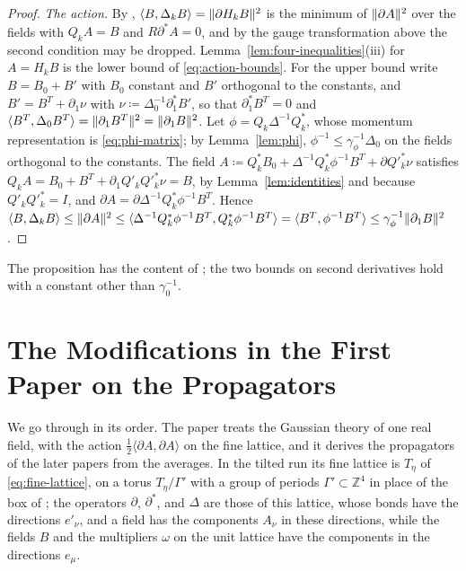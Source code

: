 \documentclass[11pt]{preprint}
\DeclarePairedDelimiter{\norm}{\lVert}{\rVert}
\numberwithin{equation}{section}
\theoremstyle{definition}
\theoremstyle{remark}
\theoremstyle{plain}
\begin{document}
\begin{proof}
\emph{The action.} By \cite[(1.47)--(1.65)]{BalabanPRT1}, $\langle B, \Delta_kB\rangle = \norm{\partial H_kB}^2$ is the minimum of $\norm{\partial A}^2$ over the fields with $Q_kA = B$ and $R\partial^*A = 0$, and by the gauge transformation above the second condition may be dropped. Lemma~\ref{lem:four-inequalities}(iii) for $A = H_kB$ is the lower bound of \eqref{eq:action-bounds}. For the upper bound write $B = B_0 + B'$ with $B_0$ constant and $B'$ orthogonal to the constants, and $B' = B^T + \partial_1\nu$ with $\nu \coloneqq \Delta_0^{-1}\partial_1^*B'$, so that $\partial_1^*B^T = 0$ and $\langle B^T, \Delta_0B^T\rangle = \norm{\partial_1B^T}^2 = \norm{\partial_1B}^2$. Let $\phi = Q_k\Delta^{-1}Q_k^*$, whose momentum representation is \eqref{eq:phi-matrix}; by Lemma~\ref{lem:phi}, $\phi^{-1} \leq \gamma_\phi^{-1}\Delta_0$ on the fields orthogonal to the constants. The field $A \coloneqq Q_k^*B_0 + \Delta^{-1}Q_k^*\phi^{-1}B^T + \partial Q'^*_k\nu$ satisfies $Q_kA = B_0 + B^T + \partial_1Q'_kQ'^*_k\nu = B$, by Lemma~\ref{lem:identities} and because $Q'_kQ'^*_k = I$, and $\partial A = \partial\Delta^{-1}Q_k^*\phi^{-1}B^T$. Hence $\langle B, \Delta_kB\rangle \leq \norm{\partial A}^2 \leq \langle\Delta^{-1}Q_k^*\phi^{-1}B^T, Q_k^*\phi^{-1}B^T\rangle = \langle B^T, \phi^{-1}B^T\rangle \leq \gamma_\phi^{-1}\norm{\partial_1B}^2$.
\end{proof}

The proposition has the content of \cite[Proposition~1.1, (1.89), (1.90), and (1.67)]{BalabanPRT1}; the two bounds on second derivatives hold with a constant other than $\gamma_0^{-1}$.

\section{The Modifications in the First Paper on the Propagators}\label{sec:prt1}

We go through \cite{BalabanPRT1} in its order. The paper treats the Gaussian theory of one real field, with the action $\frac12\langle\partial A, \partial A\rangle$ on the fine lattice, and it derives the propagators of the later papers from the averages. In the tilted run its fine lattice is $T_\eta$ of \eqref{eq:fine-lattice}, on a torus $T_\eta/\Gamma'$ with a group of periods $\Gamma' \subset \mathbb Z^4$ in place of the box of \cite[p.~17]{BalabanPRT1}; the operators $\partial$, $\partial^*$, and $\Delta$ are those of this lattice, whose bonds have the directions $e'_\nu$, and a field has the components $A_\nu$ in these directions, while the fields $B$ and the multipliers $\omega$ on the unit lattice have the components in the directions $e_\mu$.
\end{document}
